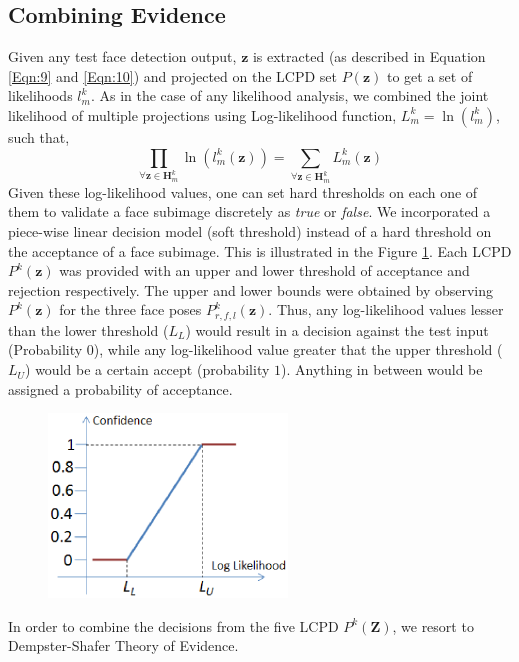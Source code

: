 \documentclass[times, 10pt,twocolumn]{article}
\begin{document}
\subsection{Combining Evidence}\label{CombiningEvidence}
Given any test face detection output, $\mathbf{z}$ is extracted (as
described in Equation \ref{Eqn:9} and \ref{Eqn:10}) and projected on
the LCPD set $P(\mathbf z)$ to get a set of likelihoods $l_m^k$. As
in the case of any likelihood analysis, we combined the joint
likelihood of multiple projections using Log-likelihood function,
$L_m^k = \ln \left(l_m^k\right)$, such that,
\begin{equation}
\prod\limits_{\forall {\mathbf z} \in {\mathbf H}^k_m}\ln
\left(l_m^k(\mathbf z)\right) =  \sum\limits_{\forall {\mathbf z}
\in {\mathbf H}^k_m}L_m^k(\mathbf z)
\end{equation}
Given these log-likelihood values, one can set hard thresholds on
each one of them to validate a face subimage discretely as {\it
true} or {\it false}. We incorporated a piece-wise linear decision
model (soft threshold) instead of a hard threshold on the acceptance
of a face subimage. This is illustrated in the Figure
\ref{Fig:Thresholds}. Each LCPD $P^k(\mathbf z)$ was provided with
an upper and lower threshold of acceptance and rejection
respectively. The upper and lower bounds were obtained by observing
$P^k(\mathbf z)$ for the three face poses $P^k_{r,f,l}(\mathbf z)$.
Thus, any log-likelihood values lesser than the lower threshold
($L_L$) would result in a decision against the test input
(Probability $0$), while any log-likelihood value greater that the
upper threshold ($L_U$) would be a certain accept (probability $1$).
Anything in between would be assigned a probability of acceptance.
\begin{figure}[h]
\centering
\hspace{-0.3in}\includegraphics[width=2.5in]{Figure11.eps}
\caption{{\bf {\selectfont }}}
\label{Fig:Thresholds}
\end{figure}
In order to combine the decisions from the five LCPD $P^k(\mathbf
Z)$, we resort to Dempster-Shafer Theory of Evidence.
\end{document}
